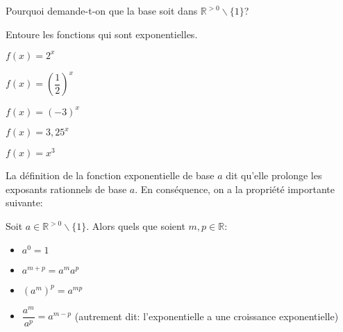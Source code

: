 \documentclass[a4paper,12pt,singlepage]{report}
\newcommand{\IR}{\mathbb{R}}
\begin{document}
Pourquoi demande-t-on que la base soit dans \(\IR^{>0}\backslash\{1\}\)?

\dotfill

\dotfill

\dotfill

\dotfill

\dotfill

\dotfill

\begin{exercice}
Entoure les fonctions qui sont exponentielles.

\par \setlength{\columnseprule}{0 pt}
          \begin{minipage}[t]{\linewidth}
          \begin{multicols}{5}

\(f(x)=2^x\)

\columnbreak

\(f(x)=\left(\dfrac{1}{2}\right)^x\)

\columnbreak

\(f(x)=(-3)^x\)

\columnbreak

\(f(x)=3,25^x\)

\columnbreak

\(f(x)=x^3\)




\end{multicols}\end{minipage}
\end{exercice}

La définition de la fonction exponentielle de base \(a\) dit qu'elle prolonge les
exposants rationnels de base \(a\). En conséquence, on a la propriété importante
suivante:
\begin{propriete}
Soit \(a\in\IR^{>0}\backslash\{1\}\). Alors quels que soient \(m,p\in\IR\):
\begin{itemize}
\item \(a^0=1\)
\item \(a^{m+p}=a^ma^p\)
\item \((a^m)^p=a^{mp}\)
\item \(\dfrac{a^m}{a^p}=a^{m-p}\) (autrement dit: l'exponentielle a une croissance
exponentielle)
\end{itemize}
\end{propriete}
\newpage
\end{document}
